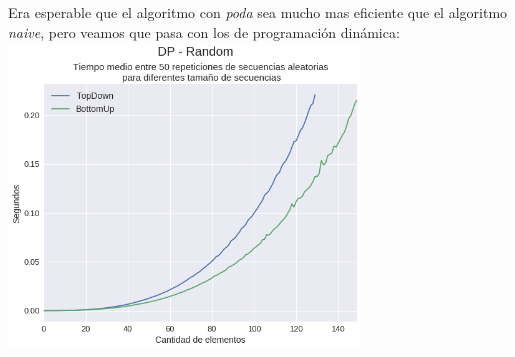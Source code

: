 Era esperable que el algoritmo con \textit{poda} sea mucho mas eficiente que el algoritmo \textit{naive}, pero veamos que pasa con los de programación dinámica: \\

{\centering
  \includegraphics[width=0.70\textwidth]{informe/img/experimentos/dp-random.png} \\
}
\hspace{1\textwidth} \\